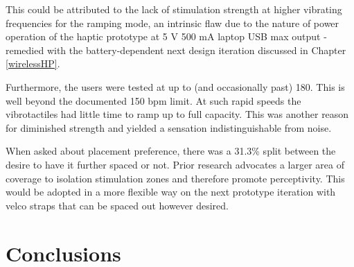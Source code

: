 This could be attributed to the lack of stimulation strength at higher vibrating frequencies for the ramping mode, an intrinsic flaw due to the nature of power operation of the haptic prototype at 5 V 500 mA laptop USB max output - remedied with the battery-dependent next design iteration discussed in Chapter \ref{wirelessHP}. 

Furthermore, the users were tested at up to (and occasionally past) 180. This is well beyond the documented 150 bpm limit. At such rapid speeds the vibrotactiles had little time to ramp up to full capacity. This was another reason for diminished strength and yielded a sensation indistinguishable from noise.

When asked about placement preference, there was a 31.3\% split between the desire to have it further spaced or not. Prior research advocates a larger area of coverage to isolation stimulation zones and therefore promote perceptivity. This would be adopted in a more flexible way on the next prototype iteration with velco straps that can be spaced out however desired.

\section{Conclusions}
